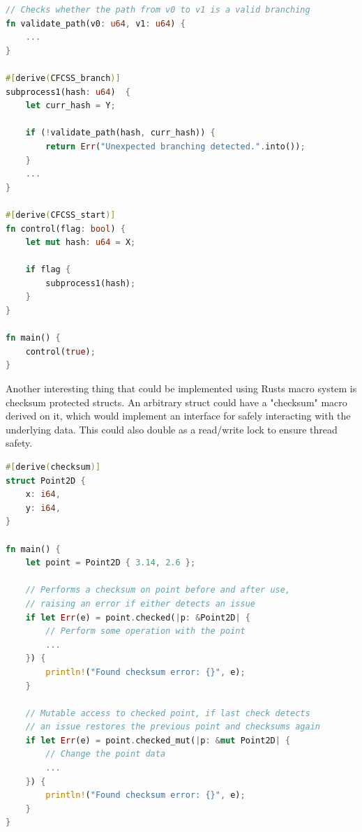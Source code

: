 \documentclass[12pt, letterpaper]{article}
\begin{document}
\begin{lstlisting}[language=Rust]
// Checks whether the path from v0 to v1 is a valid branching
fn validate_path(v0: u64, v1: u64) {
    ...
}

#[derive(CFCSS_branch)]
subprocess1(hash: u64)  {
    let curr_hash = Y;

    if (!validate_path(hash, curr_hash)) {
        return Err("Unexpected branching detected.".into());
    }
    ...
}

#[derive(CFCSS_start)]
fn control(flag: bool) {
    let mut hash: u64 = X;

    if flag {
        subprocess1(hash);
    }
}

fn main() {
    control(true);
}
\end{lstlisting}

Another interesting thing that could be implemented using Rusts macro system is checksum protected structs. An arbitrary struct could have a "checksum" macro derived on it, which would implement an interface for safely interacting with the underlying data. This could also double as a read/write lock to ensure thread safety.

\begin{lstlisting}[language=Rust]
#[derive(checksum)]
struct Point2D {
    x: i64,
    y: i64,
}

fn main() {
    let point = Point2D { 3.14, 2.6 };

    // Performs a checksum on point before and after use, 
    // raising an error if either detects an issue 
    if let Err(e) = point.checked(|p: &Point2D| {
        // Perform some operation with the point
        ...
    }) {
        println!("Found checksum error: {}", e);
    }

    // Mutable access to checked point, if last check detects 
    // an issue restores the previous point and checksums again
    if let Err(e) = point.checked_mut(|p: &mut Point2D| {
        // Change the point data
        ...
    }) {
        println!("Found checksum error: {}", e);
    }
}
\end{lstlisting}

\newpage
\printbibliography
\end{document}
